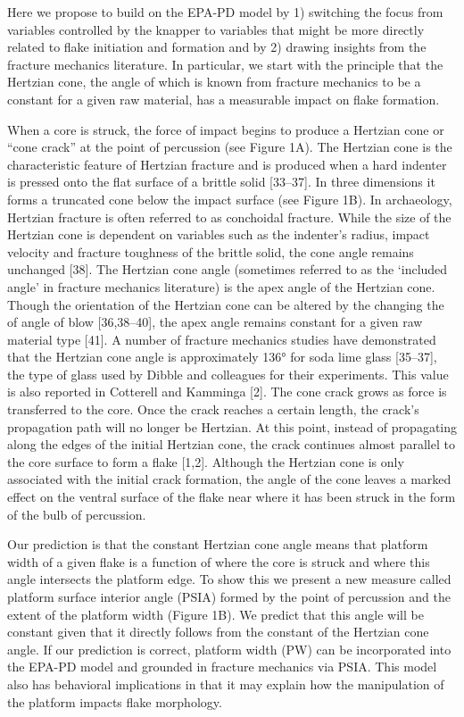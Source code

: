 \documentclass[10pt,letterpaper]{article}
\begin{document}
Here we propose to build on the EPA-PD model by 1) switching the focus
from variables controlled by the knapper to variables that might be more
directly related to flake initiation and formation and by 2) drawing
insights from the fracture mechanics literature. In particular, we start
with the principle that the Hertzian cone, the angle of which is known
from fracture mechanics to be a constant for a given raw material, has a
measurable impact on flake formation.

When a core is struck, the force of impact begins to produce a Hertzian
cone or ``cone crack'' at the point of percussion (see Figure 1A). The
Hertzian cone is the characteristic feature of Hertzian fracture and is
produced when a hard indenter is pressed onto the flat surface of a
brittle solid {[}33--37{]}. In three dimensions it forms a truncated
cone below the impact surface (see Figure 1B). In archaeology, Hertzian
fracture is often referred to as conchoidal fracture. While the size of
the Hertzian cone is dependent on variables such as the indenter's
radius, impact velocity and fracture toughness of the brittle solid, the
cone angle remains unchanged {[}38{]}. The Hertzian cone angle
(sometimes referred to as the `included angle' in fracture mechanics
literature) is the apex angle of the Hertzian cone. Though the
orientation of the Hertzian cone can be altered by the changing the of
angle of blow {[}36,38--40{]}, the apex angle remains constant for a
given raw material type {[}41{]}. A number of fracture mechanics studies
have demonstrated that the Hertzian cone angle is approximately 136° for
soda lime glass {[}35--37{]}, the type of glass used by Dibble and
colleagues for their experiments. This value is also reported in
Cotterell and Kamminga {[}2{]}. The cone crack grows as force is
transferred to the core. Once the crack reaches a certain length, the
crack's propagation path will no longer be Hertzian. At this point,
instead of propagating along the edges of the initial Hertzian cone, the
crack continues almost parallel to the core surface to form a flake
{[}1,2{]}. Although the Hertzian cone is only associated with the
initial crack formation, the angle of the cone leaves a marked effect on
the ventral surface of the flake near where it has been struck in the
form of the bulb of percussion.

Our prediction is that the constant Hertzian cone angle means that
platform width of a given flake is a function of where the core is
struck and where this angle intersects the platform edge. To show this
we present a new measure called platform surface interior angle (PSIA)
formed by the point of percussion and the extent of the platform width
(Figure 1B). We predict that this angle will be constant given that it
directly follows from the constant of the Hertzian cone angle. If our
prediction is correct, platform width (PW) can be incorporated into the
EPA-PD model and grounded in fracture mechanics via PSIA. This model
also has behavioral implications in that it may explain how the
manipulation of the platform impacts flake morphology.
\end{document}
